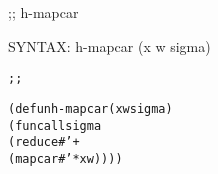 \begin{aibox}{\function}
;; h-mapcar

SYNTAX: h-mapcar (x w sigma) 
\end{aibox}

\begin{aibox}{\examples}
\begin{alltt}
\end{alltt}

\end{aibox}

\begin{aibox}{\comments}

\end{aibox}
\begin{aibox}{\answers}

\end{aibox}
\begin{aibox}{\othercomments}

\end{aibox}
\begin{aibox}{\pseudocode}

\end{aibox}
\begin{aibox}{\code}

\begin{alltt}
;;%% code

(defun h-mapcar (x w sigma) 
    (funcall sigma 
        (reduce #'+
            (mapcar #'* x w))))

\end{alltt}
\end{aibox}

